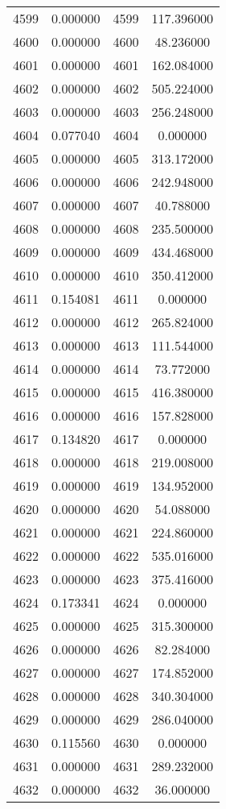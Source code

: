 \documentclass[12pt]{article}
\begin{document}
\begin{longtable}{@{}cccc@{}}
4599 & 0.000000 & 4599 & 117.396000 \\
4600 & 0.000000 & 4600 & 48.236000 \\
4601 & 0.000000 & 4601 & 162.084000 \\
4602 & 0.000000 & 4602 & 505.224000 \\
4603 & 0.000000 & 4603 & 256.248000 \\
4604 & 0.077040 & 4604 & 0.000000 \\
4605 & 0.000000 & 4605 & 313.172000 \\
4606 & 0.000000 & 4606 & 242.948000 \\
4607 & 0.000000 & 4607 & 40.788000 \\
4608 & 0.000000 & 4608 & 235.500000 \\
4609 & 0.000000 & 4609 & 434.468000 \\
4610 & 0.000000 & 4610 & 350.412000 \\
4611 & 0.154081 & 4611 & 0.000000 \\
4612 & 0.000000 & 4612 & 265.824000 \\
4613 & 0.000000 & 4613 & 111.544000 \\
4614 & 0.000000 & 4614 & 73.772000 \\
4615 & 0.000000 & 4615 & 416.380000 \\
4616 & 0.000000 & 4616 & 157.828000 \\
4617 & 0.134820 & 4617 & 0.000000 \\
4618 & 0.000000 & 4618 & 219.008000 \\
4619 & 0.000000 & 4619 & 134.952000 \\
4620 & 0.000000 & 4620 & 54.088000 \\
4621 & 0.000000 & 4621 & 224.860000 \\
4622 & 0.000000 & 4622 & 535.016000 \\
4623 & 0.000000 & 4623 & 375.416000 \\
4624 & 0.173341 & 4624 & 0.000000 \\
4625 & 0.000000 & 4625 & 315.300000 \\
4626 & 0.000000 & 4626 & 82.284000 \\
4627 & 0.000000 & 4627 & 174.852000 \\
4628 & 0.000000 & 4628 & 340.304000 \\
4629 & 0.000000 & 4629 & 286.040000 \\
4630 & 0.115560 & 4630 & 0.000000 \\
4631 & 0.000000 & 4631 & 289.232000 \\
4632 & 0.000000 & 4632 & 36.000000 \\

\end{longtable}
\end{document}
